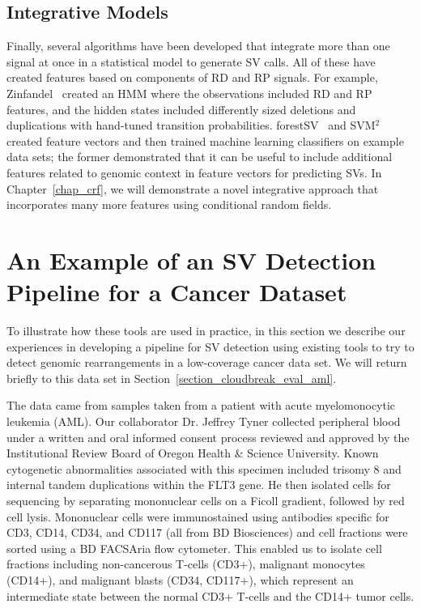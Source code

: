 \subsection{Integrative Models}

Finally, several algorithms have been developed that integrate more than one signal at once in a statistical model to generate SV calls. All of these have created features based on components of RD and RP signals. For example, Zinfandel~\cite{Shen:2011ku} created an HMM where the observations included RD and RP features, and the hidden states included differently sized deletions and duplications with hand-tuned transition probabilities. forestSV~\cite{Michaelson:2012fj} and SVM$^2$~\cite{Chiara:2012ey} created feature vectors and then trained machine learning classifiers on example data sets; the former demonstrated that it can be useful to include additional features related to genomic context in feature vectors for predicting SVs. In Chapter~\ref{chap_crf}, we will demonstrate a novel integrative approach that incorporates many more features using conditional random fields.


\section{An Example of an SV Detection Pipeline for a Cancer Dataset}\label{section_aml_pipeline}

To illustrate how these tools are used in practice, in this section we describe our experiences in developing a pipeline for SV detection using existing tools to try to detect genomic rearrangements in a low-coverage cancer data set. We will return briefly to this data set in Section~\ref{section_cloudbreak_eval_aml}.

The data came from samples taken from a patient with acute myelomonocytic leukemia (AML). Our collaborator Dr. Jeffrey Tyner collected peripheral blood under a written and oral informed consent process reviewed and approved by the Institutional Review Board of Oregon Health \& Science University. Known cytogenetic abnormalities associated with this specimen included trisomy 8 and internal tandem duplications within the FLT3 gene. He then isolated cells for sequencing by separating mononuclear cells on a Ficoll gradient, followed by red cell lysis. Mononuclear cells were immunostained using antibodies specific for CD3, CD14, CD34, and CD117 (all from BD Biosciences) and cell fractions were sorted using a BD FACSAria flow cytometer. This enabled us to isolate cell fractions including non-cancerous T-cells (CD3+), malignant monocytes (CD14+), and malignant blasts (CD34, CD117+), which represent an intermediate state between the normal CD3+ T-cells and the CD14+ tumor cells. 

